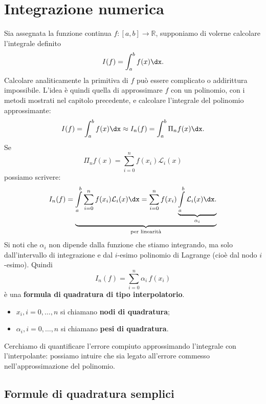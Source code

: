 \chapter{Integrazione numerica}
Sia assegnata la funzione continua $f:[ a,b]\rightarrow \mathbb{R}$, supponiamo di volerne calcolare l'integrale definito
\begin{equation}
I(f) =\int\nolimits ^{b}_{a} f(x) \dx.
\label{eq:integrale}
\end{equation}
Calcolare analiticamente la primitiva di $f$ può essere complicato o addirittura impossibile.
L'idea è quindi quella di approssimare $f$ con un polinomio, con i metodi mostrati nel capitolo precedente, e calcolare l'integrale del polinomio approssimante:
\begin{equation*}
I(f) =\int\nolimits ^{b}_{a} f(x) \dx\approx I_{n}(f) =\int ^{b}_{a}\Pi _{n} f(x) \dx.
\end{equation*}
Se
$$\Pi _{n} f(x) =\sum\limits ^{n}_{i=0} f( x_{i})\mathcal{L}_{i}(x)$$
possiamo scrivere:
\begin{equation*}
I_{n}(f) =\underbrace{\int\limits ^{b}_{a}\sum\limits ^{n}_{i=0} f( x_{i})\mathcal{L}_{i}(x) \dx=\sum\limits ^{n}_{i=0} f( x_{i})\underbrace{\int\limits ^{b}_{a}\mathcal{L}_{i}(x) \dx.}_{\alpha _{i}}}_{\text{per linearità}}
\end{equation*}
Si noti che $\alpha _{i}$ non dipende dalla funzione che stiamo integrando, ma solo dall'intervallo di integrazione e dal $i$-esimo polinomio di Lagrange (cioè dal nodo $i$-esimo).
Quindi
\begin{equation}
I_{n}(f) =\sum\limits ^{n}_{i=0} \alpha _{i} \, f( x_{i})
\label{eq:formula-quadratura-interp}
\end{equation}
è una \textbf{formula di quadratura di tipo interpolatorio}.
\begin{itemize}
\item $x_{i} ,i=0,\dotsc ,n$ si chiamano \textbf{nodi di quadratura};
\item $\alpha _{i} ,i=0,\dotsc ,n$ si chiamano \textbf{pesi di quadratura}.
\end{itemize}

Cerchiamo di quantificare l'errore compiuto approssimando l'integrale con l'interpolante: possiamo intuire che sia legato all'errore commesso nell'approssimazione del polinomio.
\section{Formule di quadratura semplici}
